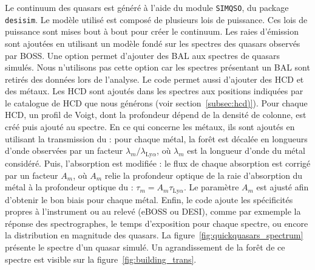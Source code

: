 Le continuum des quasars est généré à l'aide du module \texttt{SIMQSO}, du package \texttt{desisim}.
Le modèle utilisé est composé de plusieurs lois de puissance. Ces lois de puissance sont mises bout à bout pour créer le continuum.
Les raies d'émission sont ajoutées en utilisant un modèle fondé sur les spectres des quasars observés par BOSS.
Une option permet d'ajouter des BAL aux spectres de quasars simulés. Nous n'utilisons pas cette option car les spectres présentant un BAL sont retirés des données lors de l'analyse.
Le code permet aussi d'ajouter des HCD et des métaux. Les HCD sont ajoutés dans les spectres aux positions indiquées par le catalogue de HCD que nous générons (voir section~\ref{subsec:hcd)}). Pour chaque HCD, un profil de Voigt, dont la profondeur dépend de la densité de colonne, est créé puis ajouté au spectre.
En ce qui concerne les métaux, ils sont ajoutés en utilisant la transmission du \lya{} : pour chaque métal, la forêt \lya{} est décalée en longueurs d'onde observées par un facteur $\lambda_m / \lambda_{\mathrm{Ly}\alpha}$, où $\lambda_m$ est la longueur d'onde du métal considéré.
Puis, l'absorption est modifiée : 
le flux de chaque absorption est corrigé par un facteur $A_m$, où $A_m$ relie la profondeur optique de la raie d'absorption du métal à la profondeur optique du \lya{} : $\tau_m = A_m \tau_{\mathrm{Ly}\alpha}$. Le paramètre $A_m$ est ajusté afin d'obtenir le bon biais pour chaque métal.
Enfin, le code ajoute les spécificités propres à l'instrument ou au relevé (eBOSS ou DESI), comme par exmemple la réponse des spectrographes, le temps d'exposition pour chaque spectre, ou encore la distribution en magnitude des quasars.
La figure~\ref{fig:quickquasars_spectrum} présente le spectre d'un quasar simulé. Un agrandissement de la forêt \lya{} de ce spectre est visible sur la figure~\ref{fig:building_trans}.

